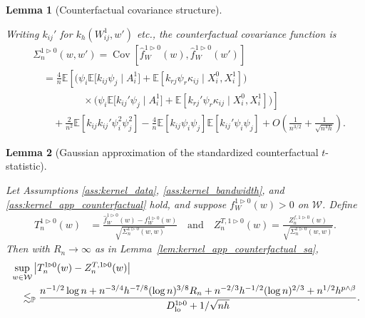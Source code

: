 \documentclass[11pt,lof]{puthesis}
\renewcommand{\P}{\ensuremath{\mathbb{P}}}
\newcommand{\E}{\ensuremath{\mathbb{E}}}
\newcommand{\cW}{\ensuremath{\mathcal{W}}}
\newcommand{\Dl}{\ensuremath{D_{\textup{lo}}}}
\DeclareMathOperator{\Cov}{Cov}
\theoremstyle{break}
\newtheorem{lemma}{Lemma}[section]
\theoremstyle{proof}
\begin{document}
\begin{lemma}[Counterfactual covariance structure]
  \label{lem:kernel_app_counterfactual_covariance_structure}

  Writing $k_{i j}'$ for $k_h(W_{i j}^1, w')$ etc.,
  the counterfactual covariance function is
  \begin{align*}
    &\Sigma_n^{1 \triangleright 0}(w,w')
    = \Cov\left[
      \hat f_W^{1 \triangleright 0}(w),
      \hat f_W^{1 \triangleright 0}(w')
    \right] \\
    &\quad=
    \frac{4}{n}
    \E\left[
      \Big(
        \psi_i
        \E\big[
          k_{i j} \psi_j
          \mid A_i^1
        \big]
        + \E\left[
          k_{r j} \psi_r
          \kappa_{i j}
          \mid X_i^0, X_i^1
        \right]
      \Big)
    \right. \\
    &\left.
      \qquad\qquad\quad
      \times
      \Big(
        \psi_i
        \E\big[
          k_{i j}' \psi_j
          \mid A_i^1
        \big]
        + \E\left[
          k_{r j}' \psi_r \kappa_{i j}
          \mid X_i^0, X_i^1
        \right]
      \Big)
    \right] \\
    &\qquad+
    \frac{2}{n^2}
    \E\left[
      k_{i j} k_{i j}'
      \psi_i^2 \psi_j^2
    \right]
    - \frac{4}{n}
    \E\left[
      k_{i j} \psi_i \psi_j
    \right]
    \E\left[
      k_{i j}' \psi_i \psi_j
    \right]
    + O\left( \frac{1}{n^{3/2}} + \frac{1}{\sqrt{n^4h}} \right).
  \end{align*}

\end{lemma}

\begin{lemma}[Gaussian approximation
  of the standardized counterfactual $t$-statistic]
  \label{lem:kernel_app_counterfactual_infeasible_t_statistic}

  Let Assumptions \ref{ass:kernel_data},
  \ref{ass:kernel_bandwidth}, and
  \ref{ass:kernel_app_counterfactual}
  hold, and suppose
  $f_W^{1 \triangleright 0}(w) > 0$ on $\cW$.
  Define
  \begin{align*}
    T_n^{1 \triangleright 0}(w)
    &= \frac{\hat f_W^{1 \triangleright 0}(w)
    - f_W^{1 \triangleright 0}(w)}
    {\sqrt{\Sigma_n^{1 \triangleright 0}(w,w)}}
    \quad\text{and}\quad
    Z_n^{T, 1 \triangleright 0}(w)
    = \frac{Z_n^{f, 1 \triangleright 0}(w)}
    {\sqrt{\Sigma_n^{1 \triangleright 0}(w,w)}}.
  \end{align*}
  Then with $R_n \to \infty$ as in Lemma~\ref{lem:kernel_app_counterfactual_sa},
  \begin{align*}
    &\sup_{w \in \cW}
    \left|
      T_n^{1 \triangleright 0}(w) - Z_n^{T, 1 \triangleright 0}(w)
    \right| \\
    &\quad\lesssim_\P
    \frac{
      n^{-1/2} \log n
      + n^{-3/4} h^{-7/8} (\log n)^{3/8} R_n
      + n^{-2/3} h^{-1/2} (\log n)^{2/3}
    + n^{1/2} h^{p \wedge \beta}}
    {\Dl^{1 \triangleright 0} + 1/\sqrt{n h}}.
  \end{align*}

\end{lemma}
\end{document}
